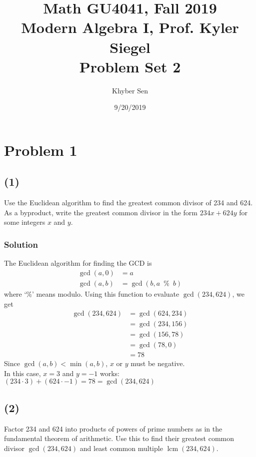 \documentclass[fleqn]{article}
\title{
Math GU4041, Fall 2019 \\
Modern Algebra I, Prof. Kyler Siegel \\
Problem Set 2
}
\author{Khyber Sen}
\date{9/20/2019}
\DeclareMathOperator{\lcm}{lcm}
\begin{document}
    
    \maketitle
    
    \section{Problem 1}
        
        \subsection{(1)}
        Use the Euclidean algorithm to find the greatest common divisor of 234 and 624.  As a byproduct, write the greatest common divisor in the form $234x + 624y$ for some integers $x$ and $y$.
            
            \subsubsection{Solution}
            The Euclidean algorithm for finding the GCD is
            \begin{align}
                \gcd(a, 0) &= a \\
                \gcd(a, b) &= \gcd(b, a \enspace \% \enspace  b)
            \end{align}
            where `\%' means modulo.  Using this function to evaluate $\gcd(234, 624)$, we get
            \begin{align}
                \gcd(234, 624) &= \gcd(624, 234) \\
                &= \gcd(234, 156) \\
                &= \gcd(156, 78) \\
                &= \gcd(78, 0) \\
                &= 78
            \end{align}
            Since $\gcd(a, b) < \min(a, b)$, $x$ or $y$ must be negative. \\
            In this case, $x = 3$ and $y = -1$ works: $(234 \cdot 3) + (624 \cdot -1) = 78 = \gcd(234, 624)$
            
        \subsection{(2)}
        Factor 234 and 624 into products of powers of prime numbers as in the fundamental theorem of arithmetic.  Use this to find their greatest common divisor $\gcd(234, 624)$ and least common multiple $\lcm(234, 624)$.
            
\end{document}

